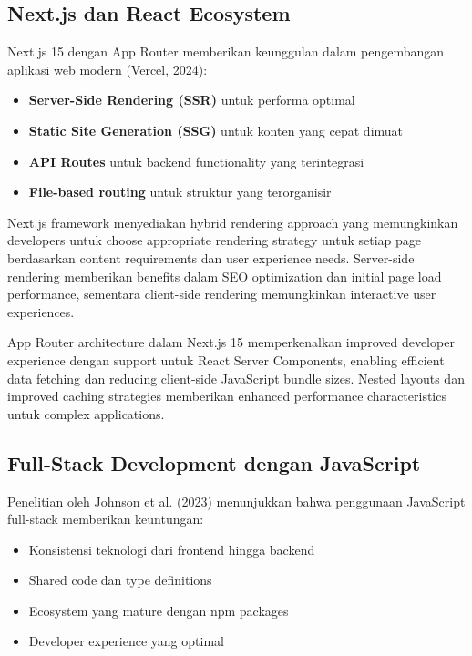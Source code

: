 \subsection{Next.js dan React Ecosystem}

Next.js 15 dengan App Router memberikan keunggulan dalam pengembangan aplikasi web modern (Vercel, 2024):

\begin{itemize}
\item \textbf{Server-Side Rendering (SSR)} untuk performa optimal
\item \textbf{Static Site Generation (SSG)} untuk konten yang cepat dimuat
\item \textbf{API Routes} untuk backend functionality yang terintegrasi
\item \textbf{File-based routing} untuk struktur yang terorganisir
\end{itemize}

Next.js framework menyediakan hybrid rendering approach yang memungkinkan developers untuk choose appropriate rendering strategy untuk setiap page berdasarkan content requirements dan user experience needs. Server-side rendering memberikan benefits dalam SEO optimization dan initial page load performance, sementara client-side rendering memungkinkan interactive user experiences.

App Router architecture dalam Next.js 15 memperkenalkan improved developer experience dengan support untuk React Server Components, enabling efficient data fetching dan reducing client-side JavaScript bundle sizes. Nested layouts dan improved caching strategies memberikan enhanced performance characteristics untuk complex applications.

\subsection{Full-Stack Development dengan JavaScript}

Penelitian oleh Johnson et al. (2023) menunjukkan bahwa penggunaan JavaScript full-stack memberikan keuntungan:

\begin{itemize}
\item Konsistensi teknologi dari frontend hingga backend
\item Shared code dan type definitions
\item Ecosystem yang mature dengan npm packages
\item Developer experience yang optimal
\end{itemize}

